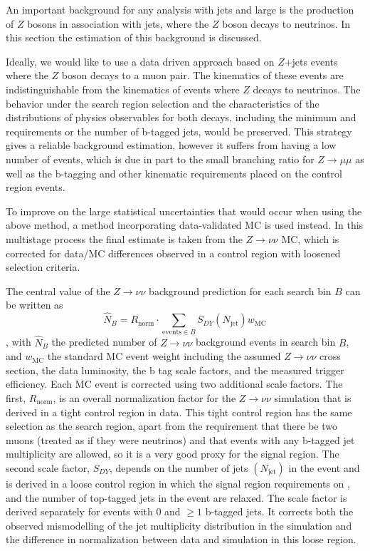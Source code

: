 An important background for any analysis with jets and large \MET is
the production of $Z$ bosons in association with jets, where the $Z$
boson decays to neutrinos.  In this section the estimation of this background
is discussed.  

Ideally, we would like to use a data driven approach based on
$Z$+jets events where the $Z$ boson decays to a
muon pair. The kinematics of these events are indistinguishable from the
kinematics of events where $Z$ decays to neutrinos.
The behavior under the search region selection and the characteristics
of the distributions of physics observables for both decays, including the minimum
\HT and \MET requirements or the number of b-tagged jets, would be
preserved.
This strategy gives a reliable background estimation, however it suffers from
having a low number of events, which is due in part to the small branching ratio for $Z \rightarrow \mu \mu$
as well as the b-tagging and other kinematic requirements placed on the control
region events.

To improve on the large statistical uncertainties that would occur when using the
above method, a method incorporating data-validated MC is used instead.
In this multistage process the final estimate is taken from the
$Z \rightarrow \nu \nu$ MC, which is corrected for
data/MC differences observed in a control region with loosened selection criteria.

The central value of the $Z \rightarrow \nu \nu$ background prediction
for each search bin $B$ can be written as
\begin{equation}
\widehat{N}_B = R_\textrm{norm} \cdot \sum_{\textrm{events}\in B} S_{DY}(N_\textrm{jet}) w_\textrm{MC}
\label{eq:zinv_pred}
\end{equation}
, with $\widehat{N}_B$ the predicted number of $Z \rightarrow \nu \nu$
background events in search bin $B$, and $w_\textrm{MC}$ the standard MC event
weight including the assumed $Z \rightarrow \nu \nu$ cross section, the data
luminosity, the b tag scale factors,
and the measured trigger efficiency.
Each MC event is corrected using two additional scale factors. The first, $R_\textrm{norm}$,
is an overall normalization factor for the $Z \rightarrow \nu \nu$ simulation
that is derived in a tight control region in data.
This tight control region has the same selection as the search region, apart from
the requirement that there be two muons (treated as if they were neutrinos) and
that events with any b-tagged jet multiplicity are allowed, so it is a very
good proxy for the signal region.
The second scale factor, $S_{DY}$, depends on the number of jets $(N_\textrm{jet})$
in the event and is derived in a loose control region in which the signal region
requirements on \MET, \MTTwo and the number of top-tagged jets in the event are
relaxed.
The scale factor is derived separately for events with 0 and ${\geq}1$ b-tagged
jets. 
It corrects both the observed mismodelling of the jet multiplicity distribution
in the simulation and the difference in normalization between data and simulation
in this loose region.

